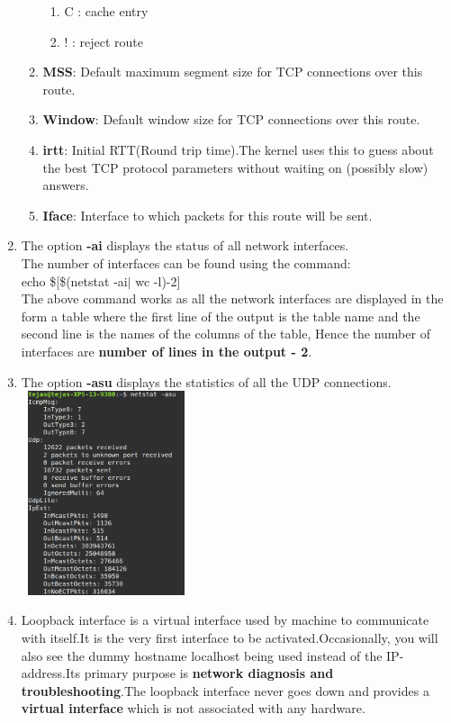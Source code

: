 \documentclass[a4paper,11pt]{article}
\begin{document}
\begin{enumerate}[itemsep=-3pt,label=(\alph*)]
\begin{enumerate}[itemsep=0pt,label=(\roman*)]
\begin{enumerate}[itemsep=0pt,label=(\arabic*)]
			\item C : cache entry 
			\item ! : reject route
		\end{enumerate}\vspace{0mm} 
	    \item \textbf{MSS}: Default maximum segment size for TCP connections over this route.
	    \item \textbf{Window}: Default window size for TCP connections over this route.
	    \item \textbf{irtt}: Initial RTT(Round trip time).The kernel uses this to guess about the best TCP protocol parameters without waiting on (possibly slow) answers.
		\item \textbf{Iface}: Interface to which packets for this route will be sent.
	\end{enumerate}
	\item The option \textbf{-ai} displays the status of all network interfaces.\\
	The number of interfaces can be found using the command:\\
	\textcolor[RGB]{23,0,229}{echo \$[\$(netstat -ai$|$ wc -l)-2]}\\
	The above command works as all the network interfaces are displayed in the form a table where the first line of the output is the table name and the second line is the names of the columns of the table, Hence the number of interfaces are \textbf{number of lines in the output - 2}.
	\item The option \textbf{-asu} displays the statistics of all the UDP connections.\\
	\includegraphics[height=60mm,width=50mm]{udp}
	\item Loopback interface is a virtual interface used by machine to communicate with itself.It is the very first interface to be activated.Occasionally, you will also see the dummy hostname localhost being used instead of the IP-address.Its primary purpose is \textbf{network diagnosis and troubleshooting}.The loopback interface never goes down and provides a \textbf{virtual interface} which is not associated with any hardware.

\end{enumerate}
\end{document}
